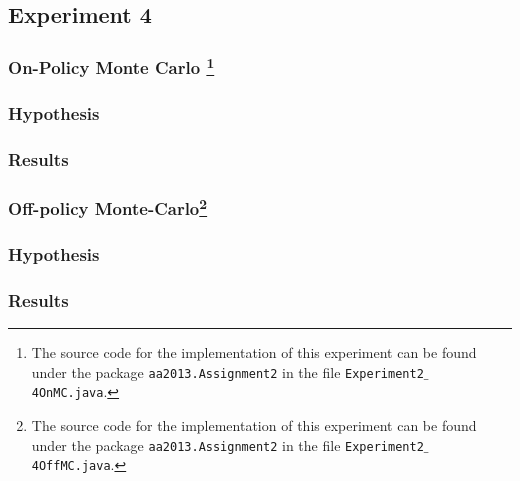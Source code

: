 \documentclass[11pt]{article}
\begin{document}
\subsection{Experiment 4}



\subsubsection[title]{On-Policy Monte Carlo \footnote{The source code for the implementation of this experiment can be found under the package \texttt{aa2013.Assignment2} in the file \texttt{Experiment2$\_$4OnMC.java}.}}




\subsubsection{Hypothesis}




\subsubsection{Results}







\subsubsection[title] {Off-policy Monte-Carlo\footnote{The source code for the implementation of this experiment can be found under the package \texttt{aa2013.Assignment2} in the file \texttt{Experiment2$\_$4OffMC.java}.}}




\subsubsection{Hypothesis}




\subsubsection{Results}
\end{document}
